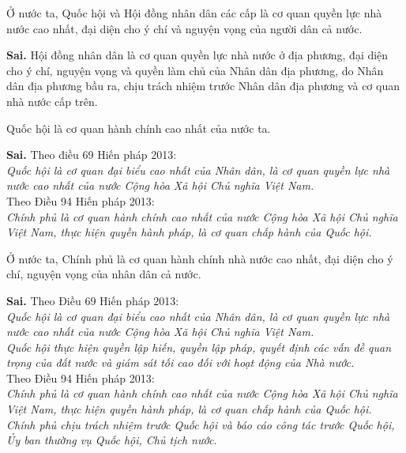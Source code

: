 \begin{ques}
Ở nước ta, Quốc hội và Hội đồng nhân dân các cấp là cơ quan quyền lực nhà nước cao nhất, đại diện cho ý chí và nguyện vọng của người dân cả nước.
\end{ques}
\begin{ans}
\textbf{Sai.} Hội đồng nhân dân là cơ quan quyền lực nhà nước ở địa phương, đại diện cho ý chí, nguyện vọng và quyền làm chủ của Nhân dân địa phương, do Nhân dân địa phương bầu ra, chịu trách nhiệm trước Nhân dân địa phương và cơ quan nhà nước cấp trên.
\end{ans}

\begin{ques}
Quốc hội là cơ quan hành chính cao nhất của nước ta.
\end{ques}
\begin{ans}
\textbf{Sai.} Theo điều 69 Hiến pháp 2013:\\
\textit{Quốc hội là cơ quan đại biểu cao nhất của Nhân dân, là cơ quan quyền lực nhà nước cao nhất của nước Cộng hòa Xã hội Chủ nghĩa Việt Nam.}\\
Theo Điều 94 Hiến pháp 2013:\\
\textit{Chính phủ là cơ quan hành chính cao nhất của nước Cộng hòa Xã hội Chủ nghĩa Việt Nam, thực hiện quyền hành pháp, là cơ quan chấp hành của Quốc hội.}
\end{ans}

\begin{ques}
Ở nước ta, Chính phủ là cơ quan hành chính nhà nước cao nhất, đại diện cho ý chí, nguyện vọng của nhân dân cả nước.
\end{ques}
\begin{ans}
\textbf{Sai.} Theo Điều 69 Hiến pháp 2013:\\
\textit{Quốc hội là cơ quan đại biểu cao nhất của Nhân dân, là cơ quan quyền lực nhà nước cao nhất của nước Cộng hòa Xã hội Chủ nghĩa Việt Nam.}\\
\textit{Quốc hội thực hiện quyền lập hiến, quyền lập pháp, quyết định các vấn đề quan trọng của đất nước và giám sát tối cao đối với hoạt động của Nhà nước.}\\
Theo Điều 94 Hiến pháp 2013:\\
\textit{Chính phủ là cơ quan hành chính cao nhất của nước Cộng hòa Xã hội Chủ nghĩa Việt Nam, thực hiện quyền hành pháp, là cơ quan chấp hành của Quốc hội.}\\
\textit{Chính phủ chịu trách nhiệm trước Quốc hội và báo cáo công tác trước Quốc hội, Ủy ban thường vụ Quốc hội, Chủ tịch nước.}
\end{ans}

